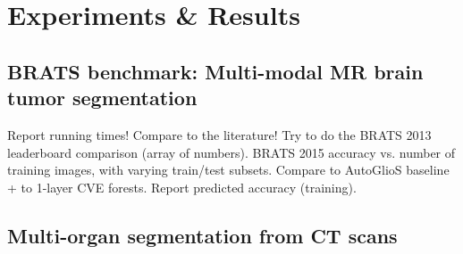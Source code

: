 \section{Experiments \& Results}
\label{sec: results}




\subsection{BRATS benchmark: Multi-modal MR brain tumor segmentation}

Report running times! Compare to the literature! Try to do the BRATS 2013 leaderboard comparison (array of numbers). BRATS 2015 accuracy vs. number of training images, with varying train/test subsets. Compare to AutoGlioS baseline + to 1-layer CVE forests. Report predicted accuracy (training).

\subsection{Multi-organ segmentation from CT scans}
